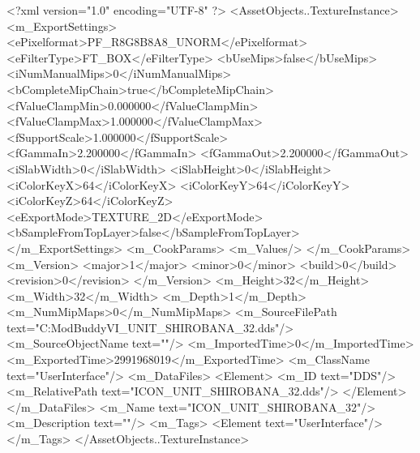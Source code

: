 <?xml version="1.0" encoding="UTF-8" ?>
<AssetObjects..TextureInstance>
	<m_ExportSettings>
		<ePixelformat>PF_R8G8B8A8_UNORM</ePixelformat>
		<eFilterType>FT_BOX</eFilterType>
		<bUseMips>false</bUseMips>
		<iNumManualMips>0</iNumManualMips>
		<bCompleteMipChain>true</bCompleteMipChain>
		<fValueClampMin>0.000000</fValueClampMin>
		<fValueClampMax>1.000000</fValueClampMax>
		<fSupportScale>1.000000</fSupportScale>
		<fGammaIn>2.200000</fGammaIn>
		<fGammaOut>2.200000</fGammaOut>
		<iSlabWidth>0</iSlabWidth>
		<iSlabHeight>0</iSlabHeight>
		<iColorKeyX>64</iColorKeyX>
		<iColorKeyY>64</iColorKeyY>
		<iColorKeyZ>64</iColorKeyZ>
		<eExportMode>TEXTURE_2D</eExportMode>
		<bSampleFromTopLayer>false</bSampleFromTopLayer>
	</m_ExportSettings>
	<m_CookParams>
		<m_Values/>
	</m_CookParams>
	<m_Version>
		<major>1</major>
		<minor>0</minor>
		<build>0</build>
		<revision>0</revision>
	</m_Version>
	<m_Height>32</m_Height>
	<m_Width>32</m_Width>
	<m_Depth>1</m_Depth>
	<m_NumMipMaps>0</m_NumMipMaps>
	<m_SourceFilePath text="C:\Users\asus\Documents\Firaxis ModBuddy\Civilization VI\temppic\ICON_UNIT_SHIROBANA_32.dds"/>
	<m_SourceObjectName text=""/>
	<m_ImportedTime>0</m_ImportedTime>
	<m_ExportedTime>2991968019</m_ExportedTime>
	<m_ClassName text="UserInterface"/>
	<m_DataFiles>
		<Element>
			<m_ID text="DDS"/>
			<m_RelativePath text="ICON_UNIT_SHIROBANA_32.dds"/>
		</Element>
	</m_DataFiles>
	<m_Name text="ICON_UNIT_SHIROBANA_32"/>
	<m_Description text=""/>
	<m_Tags>
		<Element text="UserInterface"/>
	</m_Tags>
</AssetObjects..TextureInstance>

